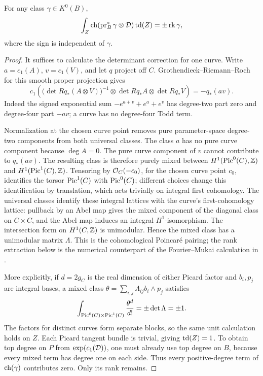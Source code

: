 \begin{lemma}\label{lem:mixed-picard-pairing}
For any class \(\gamma\in K^0(B)\),
\[
\int_Z\operatorname{ch}(\operatorname{pr}_B^*\gamma\otimes\mathcal D)\operatorname{td}(Z)
   =\pm\operatorname{rk}\gamma,
\]
where the sign is independent of \(\gamma\).
\end{lemma}
\begin{proof}
It suffices to calculate the determinant correction for one curve.
Write \(a=c_1(A)\), \(v=c_1(V)\), and let \(q\) project off \(C\).
Grothendieck--Riemann--Roch for this smooth proper projection gives
\[
c_1\!\left(\bigl(\det Rq_*(A\otimes V)\bigr)^{-1}
       \otimes\det Rq_*A\otimes\det Rq_*V\right)
       =-q_*(av).
\]
Indeed the signed exponential sum
\(-e^{a+v}+e^a+e^v\) has degree-two part zero and degree-four
part \(-av\); a curve has no degree-four Todd term.

Normalization at the chosen curve point removes pure
parameter-space degree-two components from both universal classes.
The class \(a\) has no pure curve component because \(\deg A=0\).
The pure curve component of \(v\) cannot contribute to \(q_*(av)\).
The resulting class is therefore purely mixed between
\(H^1(\operatorname{Pic}^0(C),\mathbb Z)\) and \(H^1(\operatorname{Pic}^1(C),\mathbb Z)\).
Tensoring by \(\mathcal O_C(-c_0)\), for the chosen curve point \(c_0\),
identifies the torsor \(\operatorname{Pic}^1(C)\) with \(\operatorname{Pic}^0(C)\); different
choices change this identification by translation, which acts trivially
on integral first cohomology. The universal classes identify these
integral lattices with the curve's first-cohomology lattice: pullback by
an Abel map gives
the mixed component of the diagonal class on \(C\times C\), and
the Abel map induces an integral \(H^1\)-isomorphism.
The intersection form on \(H^1(C,\mathbb Z)\) is unimodular.  Hence the
mixed class has a unimodular matrix \(\Lambda\).
This is the cohomological Poincar\'e pairing; the rank extraction below
is the numerical counterpart of the Fourier--Mukai calculation in
\cite[Theorem~2.2 and Example~2.6]{Mukai81}.

More explicitly, if \(d=2g_C\) is the real dimension of either
Picard factor and \(b_i,p_j\) are integral bases, a mixed class
\(\theta=\sum_{i,j}\Lambda_{ij}b_i\wedge p_j\) satisfies
\[
\int_{\operatorname{Pic}^0(C)\times\operatorname{Pic}^1(C)}\frac{\theta^d}{d!}
       =\pm\det\Lambda=\pm1.
\]
The factors for distinct curves form separate blocks, so the same
unit calculation holds on \(Z\).
Each Picard tangent bundle is trivial, giving \(\operatorname{td}(Z)=1\).
To obtain top degree on \(P\) from \(\exp(c_1(\mathcal D))\), one must
already use top degree on \(B\), because every mixed term has
degree one on each side.  Thus every positive-degree term of
\(\operatorname{ch}(\gamma)\) contributes zero.  Only its rank remains.
\end{proof}

